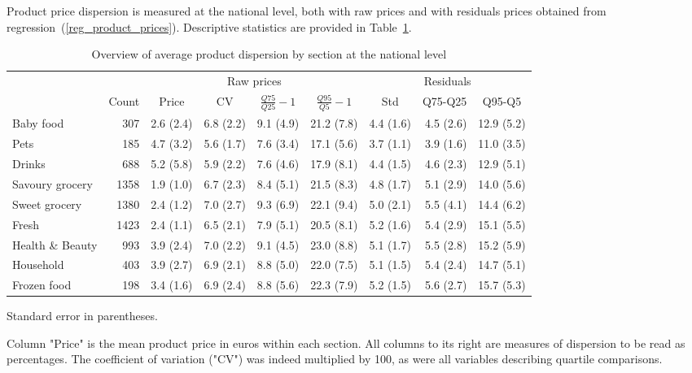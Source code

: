\documentclass[english]{article}
\begin{document}
Product price dispersion is measured at the national level, both with raw prices and with residuals prices obtained from regression~(\ref{reg_product_prices}). Descriptive statistics are provided in Table~\ref{tab:stats_nat_dispersion}.

\begin{table}[H]
\begin{threeparttable}
\renewcommand{\arraystretch}{0.7}%
\caption{Overview of average product dispersion by section at the national level}
\label{tab:stats_nat_dispersion}
\small
\begin{tabular}{lr|rrrr|rrr}
\toprule
\toprule
      & \multicolumn{1}{c|}{} & \multicolumn{4}{c|}{Raw prices} & \multicolumn{3}{c}{Residuals} \\
      & \multicolumn{1}{c|}{Count} & \multicolumn{1}{c}{Price} & \multicolumn{1}{c}{CV} & \multicolumn{1}{c}{$\frac{Q75}{Q25}-1$} & \multicolumn{1}{c|}{$\frac{Q95}{Q5}-1$} & \multicolumn{1}{c}{Std} & \multicolumn{1}{c}{Q75-Q25} & \multicolumn{1}{c}{Q95-Q5} \\
\midrule
Baby food & 307   & 2.6 (2.4) & 6.8 (2.2) & 9.1 (4.9) & 21.2 (7.8) & 4.4 (1.6) & 4.5 (2.6) & 12.9 (5.2) \\
Pets  & 185   & 4.7 (3.2) & 5.6 (1.7) & 7.6 (3.4) & 17.1 (5.6) & 3.7 (1.1) & 3.9 (1.6) & 11.0 (3.5) \\
Drinks & 688   & 5.2 (5.8) & 5.9 (2.2) & 7.6 (4.6) & 17.9 (8.1) & 4.4 (1.5) & 4.6 (2.3) & 12.9 (5.1) \\
Savoury grocery & 1358  & 1.9 (1.0) & 6.7 (2.3) & 8.4 (5.1) & 21.5 (8.3) & 4.8 (1.7) & 5.1 (2.9) & 14.0 (5.6) \\
Sweet grocery & 1380  & 2.4 (1.2) & 7.0 (2.7) & 9.3 (6.9) & 22.1 (9.4) & 5.0 (2.1) & 5.5 (4.1) & 14.4 (6.2) \\
Fresh & 1423  & 2.4 (1.1) & 6.5 (2.1) & 7.9 (5.1) & 20.5 (8.1) & 5.2 (1.6) & 5.4 (2.9) & 15.1 (5.5) \\
Health \& Beauty & 993   & 3.9 (2.4) & 7.0 (2.2) & 9.1 (4.5) & 23.0 (8.8) & 5.1 (1.7) & 5.5 (2.8) & 15.2 (5.9) \\
Household & 403   & 3.9 (2.7) & 6.9 (2.1) & 8.8 (5.0) & 22.0 (7.5) & 5.1 (1.5) & 5.4 (2.4) & 14.7 (5.1) \\
Frozen food & 198   & 3.4 (1.6) & 6.9 (2.4) & 8.8 (5.6) & 22.3 (7.9) & 5.2 (1.5) & 5.6 (2.7) & 15.7 (5.3) \\
\bottomrule
\bottomrule
\end{tabular}
\begin{tablenotes}
      \small
			\item Standard error in parentheses.
      \item Column "Price" is the mean product price in euros within each section. All columns to its right are measures of dispersion to be read as percentages. The coefficient of variation ("CV") was indeed multiplied by 100, as were all variables describing quartile comparisons.
\end{tablenotes}
\end{threeparttable}
\end{table}
\end{document}
